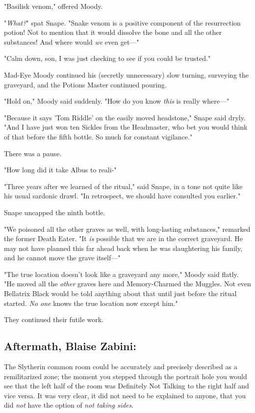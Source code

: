 "Basilisk venom," offered Moody.

"\emph{What?}" spat Snape. "Snake venom is a positive component of the 
resurrection potion! Not to mention that it would dissolve the bone and all the 
other substances! And where would \emph{we} even get---"

"Calm down, son, I was just checking to see if you could be trusted."

Mad-Eye Moody continued his (secretly unnecessary) slow turning, surveying the 
graveyard, and the Potions Master continued pouring.

"Hold on," Moody said suddenly. "How do you know \emph{this} is really where---"

"Because it says 'Tom Riddle' on the easily moved headstone," Snape said dryly. 
"And I have just won ten Sickles from the Headmaster, who bet you would think 
of that before the fifth bottle. So much for constant vigilance."

There was a pause.

"How long did it take Albus to reali-"

"Three years after we learned of the ritual," said Snape, in a tone not quite 
like his usual sardonic drawl. "In retrospect, we should have consulted you 
earlier."

Snape uncapped the ninth bottle.

"We poisoned all the other graves as well, with long-lasting substances," 
remarked the former Death Eater. "It \emph{is} possible that we are in the 
correct graveyard. He may not have planned this far ahead back when he was 
slaughtering his family, and he cannot move the grave itself---"

"The true location doesn't look like a graveyard any more," Moody said flatly. 
"He moved all the \emph{other} graves here and Memory-Charmed the Muggles. Not 
even Bellatrix Black would be told anything about that until just before the 
ritual started. \emph{No one} knows the true location now except him."

They continued their futile work.
\sbreak
\subsection{Aftermath, Blaise Zabini:}

The Slytherin common room could be accurately and precisely described as a 
remilitarized zone; the moment you stepped through the portrait hole you would 
see that the left half of the room was Definitely Not Talking to the right half 
and vice versa. It was very clear, it did not need to be explained to anyone, 
that you did \emph{not} have the option of \emph{not taking sides}.

